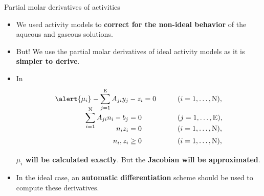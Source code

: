 \begin{frame}{Partial molar derivatives of activities}
\begin{itemize}[<+->]
\item We used activity models to {\bf correct for the non-ideal behavior}
of the aqueous and gaseous solutions.
\item But! We use the partial molar derivatives of ideal activity models as it is {\bf simpler to derive}. 
%
\item In\\[-30pt]
%
\begin{alignat*}{2}
	\alert{\mu_{i}}-\sum_{j=1}^{\text{E}}A_{ji}y_{j} & -z_{i}=0 & \qquad\vphantom{\frac{\partial L}{\partial y_{j}}} & (i=1,\ldots,\text{N}),\\[-10pt]
	\sum_{i=1}^{\text{N}}A_{ji}n_{i}-b_{j} & =0 & \vphantom{\frac{\partial L}{\partial y_{j}}} & (j=1,\ldots,\text{E}),\\[-15pt]
	n_{i}z_{i} & =0 & \vphantom{\frac{\partial L}{\partial y_{j}}} & (i=1,\ldots,\text{N}),\\[-10pt]
	n_{i},z_{i} & \geq0 & \vphantom{\frac{\partial L}{\partial y_{j}}} & (i=1,\ldots,\text{N}),
\end{alignat*}
%
\alert{\bf $\mu_{i}$ will be calculated exactly}. But the {\bf Jacobian will be approximated}.
%
\item In the ideal case, an \alert{\bf automatic differentiation} scheme should be used to compute these derivatives.
\end{itemize}

\end{frame}
%
%
